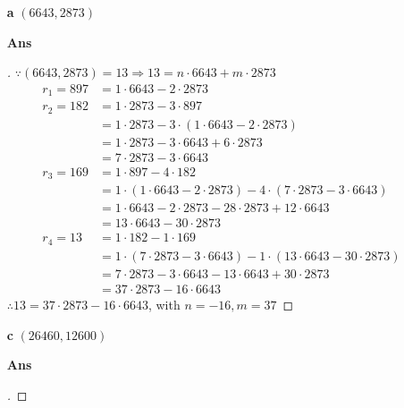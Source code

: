 \documentclass[paper=usletter, fontsize=12pt]{article}
\begin{document}
\begin{itemize}
\begin{itemize}
\begin{itemize}
                \item[\textbf{a}] $(6643, 2873)$
                \item[\textbf{Ans}]
                \begin{proof}[\unskip\nopunct]
                    $\because (6643, 2873) = 13 \Rightarrow 13 = n \cdot 6643 + m \cdot 2873$
                    \begin{align*}
                        r_1 = 897 & = 1 \cdot 6643 - 2 \cdot 2873 \\
                        r_2 = 182 & = 1 \cdot 2873 - 3 \cdot 897 \\
                        & =  1 \cdot 2873 - 3 \cdot (1 \cdot 6643 - 2 \cdot 2873) \\
                        & =  1 \cdot 2873 - 3 \cdot 6643 + 6 \cdot 2873 \\
                        & =  7 \cdot 2873 - 3 \cdot 6643 \\
                        r_3 = 169 & = 1 \cdot 897 - 4 \cdot 182 \\
                        & = 1 \cdot (1 \cdot 6643 - 2 \cdot 2873) - 4 \cdot (7
                        \cdot 2873 - 3 \cdot 6643) \\
                        & = 1 \cdot 6643 - 2 \cdot 2873 - 28 \cdot 2873 + 12 \cdot 6643 \\
                        & = 13 \cdot 6643 - 30 \cdot 2873 \\
                        r_4 = 13 & = 1 \cdot 182 - 1 \cdot 169 \\
                        & = 1 \cdot (7 \cdot 2873 - 3 \cdot 6643) - 1 \cdot (13 \cdot 6643 - 30 \cdot 2873) \\
                        & = 7 \cdot 2873 - 3 \cdot 6643 - 13 \cdot 6643 + 30 \cdot 2873 \\
                        & = 37 \cdot 2873 - 16 \cdot 6643
                    \end{align*}
                    $\therefore 13 = 37 \cdot 2873 - 16 \cdot 6643$, with $n = -16, m = 37$ \qedhere
                \end{proof}
                \vspace{0.2in}

                \item[\textbf{c}] $(26460, 12600)$
                \item[\textbf{Ans}]
                \begin{proof}[\unskip\nopunct]
                \end{proof}
                \vspace{0.2in}


\end{itemize}
\end{itemize}
\end{itemize}
\end{document}
